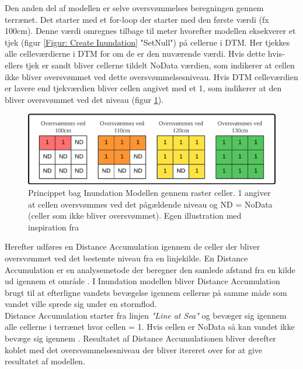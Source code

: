 Den anden del af modellen er selve oversvømmelses beregningen gennem terrænet. Det starter med et for-loop der starter med den første værdi (fx 100cm). Denne værdi omregnes tilbage til meter hvorefter modellen eksekverer et tjek (figur \ref{Figur: Create Inundation} "SetNull") på cellerne i DTM. Her tjekkes alle celleværdierne i DTM for om de er \geq den nuværende værdi. Hvis dette hvis-ellers tjek er sandt bliver cellerne tildelt NoData værdien, som indikerer at cellen ikke bliver oversvømmet ved dette oversvømmelsesniveau. Hvis DTM celleværdien er lavere end tjekværdien bliver cellen angivet med et 1, som indikerer at den bliver oversvømmet ved det niveau (figur \ref{Figur: Celler Inundated}).       

\begin{figure}[H]
    \centering
    \includegraphics[width=0.7\linewidth]{images/teori/celler_inundated.png}
    \caption{Princippet bag Inundation Modellen gennem raster celler. 1 angiver at cellen oversvømmes ved det pågældende niveau og ND = NoData (celler som ikke bliver oversvømmet).  Egen illustration med inspiration fra \cite{balstrom_kirby_inundation}}
    \label{Figur: Celler Inundated}
\end{figure}

Herefter udføres en Distance Accumulation igennem de celler der bliver oversvømmet ved det bestemte niveau fra en linjekilde. En Distance Accumulation er en analysemetode der beregner den samlede afstand fra en kilde ud igennem et område \citep{esri_how_nodate}. I Inundation modellen bliver Distance Accumulation brugt til at efterligne vandets bevægelse igennem cellerne på samme måde som vandet ville sprede sig under en stormflod. \\ 
Distance Accumulation starter fra linjen \textit{"Line at Sea"} og bevæger sig igennem alle cellerne i terrænet hvor cellen = 1. Hvis cellen er NoData så kan vandet ikke bevæge sig igennem \citep{balstrom_kirby_inundation}. Resultatet af Distance Accumulationen bliver derefter koblet med det oversvømmelsesniveau der bliver itereret over for at give resultatet af modellen.  
